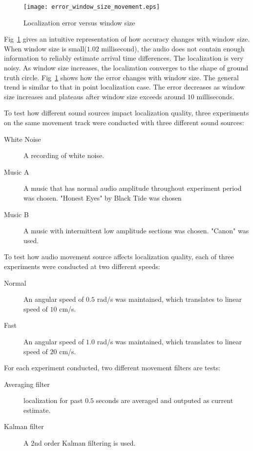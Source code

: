 \begin{figure}[]
\texttt{[image: error\_window\_size\_movement.eps]}
\caption{Localization error versus window size}
\label{fig:err_win_circle}
\end{figure}


Fig~\ref{fig:err_win_circle} gives an intuitive representation of how accuracy changes with window size. When window size is small($1.02$ millisecond), the audio does not contain enough information to reliably estimate arrival time differences. The localization is very noisy. As window size increases, the localization converges to the shape of ground truth circle. Fig~\ref{fig:err_win_circle} shows how the error changes with window size. The general trend is similar to that in point localization case. The error decreases as window size increases and plateaus after window size exceeds around $10$ milliseconds.

To test how different sound sources impact localization quality, three experiments on the same movement track were conducted with three different sound sources:

\begin{description}

\item[White Noise] A recording of white noise.

\item[Music A] A music that has normal audio amplitude throughout experiment period was chosen. "Honest Eyes" by Black Tide was chosen 

\item[Music B] A music with intermittent low amplitude sections was chosen. "Canon" was used.

\end{description} 

To test how audio movement source affects localization quality, each of three experiments were conducted at two different speeds:
\begin{description}
\item[Normal] An angular speed of $0.5$ rad/s was maintained, which translates to linear speed of $10$ cm/s.
\item[Fast] An angular speed of $1.0$ rad/s was maintained, which translates to linear speed of $20$ cm/s.
\end{description}

For each experiment conducted, two different movement filters are tests:
\begin{description}
\item[Averaging filter] localization for past $0.5$ seconds are averaged and outputed as current estimate.
\item[Kalman filter] A 2nd order Kalman filtering is used.
\end{description}


